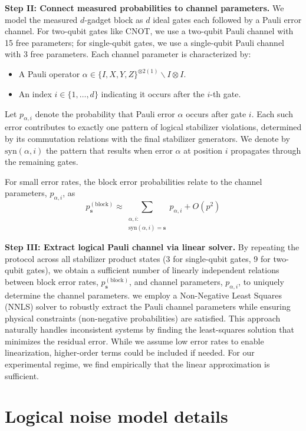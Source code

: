 \documentclass[aps, prx, reprint, superscriptaddress, longbibliography, floatfix]{revtex4-2}
\begin{document}
\textbf{Step II: Connect measured probabilities to channel parameters.} We model the measured $d$-gadget block as $d$ ideal gates each followed by a Pauli error channel. For two-qubit gates like CNOT, we use a two-qubit Pauli channel with 15 free parameters; for single-qubit gates, we use a single-qubit Pauli channel with 3 free parameters. Each channel parameter is characterized by:
\begin{itemize}
    \item A Pauli operator $\alpha \in \{I,X,Y,Z\}^{\otimes2 (1)} \backslash {I \otimes I}$.
    \item An index $i \in \{1, \dots, d \}$ indicating it occurs after the $i$-th gate.
\end{itemize}
Let $p_{\alpha,i}$ denote the probability that Pauli error $\alpha$ occurs after gate $i$. Each such error contributes to exactly one pattern of logical stabilizer violations, determined by its commutation relations with the final stabilizer generators. We denote by $\text{syn}(\alpha, i)$ the pattern that results when error $\alpha$ at position $i$ propagates through the remaining gates.

For small error rates, the block error probabilities relate to the channel parameters, $p_{\alpha,i}$, as
\begin{equation}
p^{(\text{block})}_{\mathbf{s}} \approx \sum_{\substack{\alpha,i: \\ \text{syn}(\alpha,i) = \mathbf{s}}} p_{\alpha,i} + O(p^2)
\end{equation}


\textbf{Step III: Extract logical Pauli channel via linear solver.} By repeating the protocol across all stabilizer product states (3 for single-qubit gates, 9 for two-qubit gates), we obtain a sufficient number of linearly independent relations between block error rates, $p^{(\text{block})}_{\mathbf{s}}$, and channel parameters, $p_{\alpha,i}$, to uniquely determine the channel parameters. we employ a Non-Negative Least Squares (NNLS) solver \cite{lawson1974} to robustly extract the Pauli channel parameters while ensuring physical constraints (non-negative probabilities) are satisfied. This approach naturally handles inconsistent systems by finding the least-squares solution that minimizes the residual error. While we assume low error rates to enable linearization, higher-order terms could be included if needed. For our experimental regime, we find empirically that the linear approximation is sufficient.


\section{Logical noise model details}
\label{sec:logical_noise}
\end{document}
